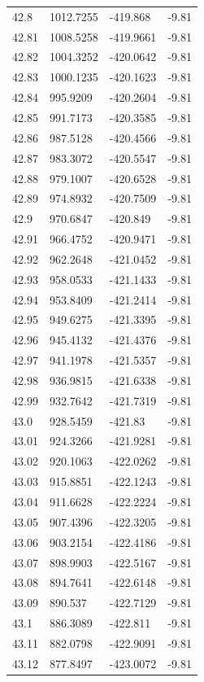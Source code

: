 \begin{table}[H]
\begin{tabular}{llll}
42.8 & 1012.7255 & -419.868 & -9.81 \\
42.81 & 1008.5258 & -419.9661 & -9.81 \\
42.82 & 1004.3252 & -420.0642 & -9.81 \\
42.83 & 1000.1235 & -420.1623 & -9.81 \\
42.84 & 995.9209 & -420.2604 & -9.81 \\
42.85 & 991.7173 & -420.3585 & -9.81 \\
42.86 & 987.5128 & -420.4566 & -9.81 \\
42.87 & 983.3072 & -420.5547 & -9.81 \\
42.88 & 979.1007 & -420.6528 & -9.81 \\
42.89 & 974.8932 & -420.7509 & -9.81 \\
42.9 & 970.6847 & -420.849 & -9.81 \\
42.91 & 966.4752 & -420.9471 & -9.81 \\
42.92 & 962.2648 & -421.0452 & -9.81 \\
42.93 & 958.0533 & -421.1433 & -9.81 \\
42.94 & 953.8409 & -421.2414 & -9.81 \\
42.95 & 949.6275 & -421.3395 & -9.81 \\
42.96 & 945.4132 & -421.4376 & -9.81 \\
42.97 & 941.1978 & -421.5357 & -9.81 \\
42.98 & 936.9815 & -421.6338 & -9.81 \\
42.99 & 932.7642 & -421.7319 & -9.81 \\
43.0 & 928.5459 & -421.83 & -9.81 \\
43.01 & 924.3266 & -421.9281 & -9.81 \\
43.02 & 920.1063 & -422.0262 & -9.81 \\
43.03 & 915.8851 & -422.1243 & -9.81 \\
43.04 & 911.6628 & -422.2224 & -9.81 \\
43.05 & 907.4396 & -422.3205 & -9.81 \\
43.06 & 903.2154 & -422.4186 & -9.81 \\
43.07 & 898.9903 & -422.5167 & -9.81 \\
43.08 & 894.7641 & -422.6148 & -9.81 \\
43.09 & 890.537 & -422.7129 & -9.81 \\
43.1 & 886.3089 & -422.811 & -9.81 \\
43.11 & 882.0798 & -422.9091 & -9.81 \\
43.12 & 877.8497 & -423.0072 & -9.81 \\

\end{tabular}
\end{table}
